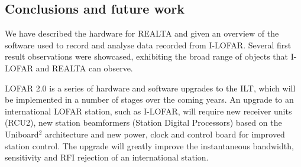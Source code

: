 \subsection{Conclusions and future work}
\label{sec:future_work}

We have described the hardware for REALTA and given an overview of the software used to record and analyse data recorded from I-LOFAR. Several first result observations were showcased, exhibiting the broad range of objects that I-LOFAR and REALTA can observe. 

LOFAR 2.0 is a series of hardware and software upgrades to the ILT, which will be implemented in a number of stages over the coming years. An upgrade to an international LOFAR station, such as I-LOFAR, will require new receiver units (RCU2), new station beamformers (Station Digital Processors) based on the Uniboard$^2$ architecture \citep{Schoonderbeek2019} and new power, clock and control board for improved station control. The upgrade will greatly improve the instantaneous bandwidth, sensitivity and RFI rejection of an international station.



